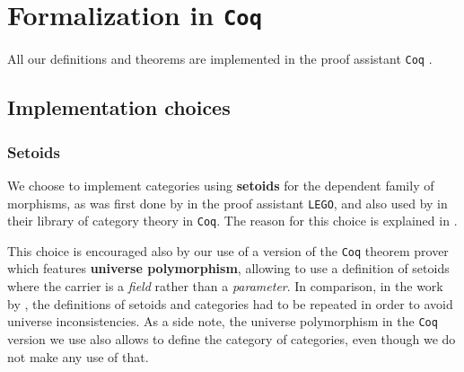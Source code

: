 \documentclass{amsart}
\newcommand{\fat}[1]{\textbf{#1}}
\begin{document}
\begin{comment}
\begin{example}[Infinite branching trees]
  Let $B$ a set. We consider $B$ as a setoid via the functor $\eq:\Set\to\Setoid$, which we silently apply.
  The hom functor $Y \mapsto \Setoid(B,Y)$ is an endofunctor on the category $\Setoid$: for any two setoids $X,Y$, 
   the set of setoid morphisms $\Setoid(X,Y)$ is itself equiped with an equivalence relation.
   Branching is given by postcomposition (\Cref{def:postcomposition_functor}) with such a hom functor.
\end{example}
\end{comment}




\section{Formalization in \texttt{Coq}}\label{sec:formal}

All our definitions and theorems are implemented in the proof assistant \texttt{Coq} \parencite{coq84pl3}.


\subsection{Implementation choices}



\subsubsection{Setoids}

We choose to implement categories using \fat{setoids} for the dependent family of morphisms, as was first done by
\textcite{aczel_galois} in the proof assistant \texttt{LEGO}, and also used by \textcite{concat} in their library
of category theory in \texttt{Coq}.
The reason for this choice is explained in \parencite[Sec.\ 3.1.2]{ahrens_zsido}.

This choice is encouraged also by our use of a version of the \texttt{Coq} theorem prover which features \fat{universe polymorphism},
allowing to use a definition of setoids where the carrier is a \emph{field} rather than a \emph{parameter}.
In comparison, in the work by \textcite{concat}, the definitions of setoids and categories had to be repeated in order to avoid
universe inconsistencies.
As a side note, the universe polymorphism in the \texttt{Coq} version we use also allows to define the category of categories, even though
we do not make any use of that.
\end{document}
